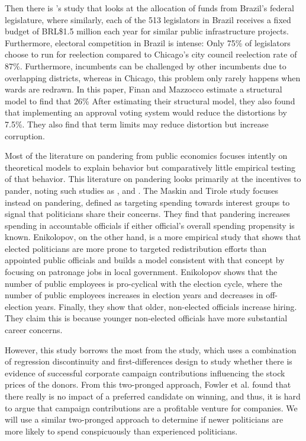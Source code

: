 Then there is \cite{finan2021electoral}'s study that looks at the allocation of funds from Brazil's federal legislature, where similarly, each of the 513 legislators in Brazil receives a fixed budget of BRL\$1.5 million each year for similar public infrastructure projects.  
Furthermore, electoral competition in Brazil is intense: Only 75\% of legislators choose to run for reelection compared to Chicago's city council reelection rate of 87\%.
Furthermore, incumbents can be challenged by other incumbents due to overlapping districts, whereas in Chicago, this problem only rarely happens when wards are redrawn.
In this paper, Finan and Mazzocco estimate a structural model to find that 26\% %
After estimating their structural model, they also found that implementing an approval voting system would reduce the distortions by 7.5\%. 
They also find that term limits may reduce distortion but increase corruption.

Most of the literature on pandering from public economics focuses intently on theoretical models to explain behavior but comparatively little empirical testing of that behavior. 
This literature on pandering looks primarily at the incentives to pander, noting such studies as \cite{MASKIN201979},  and \cite{ENIKOLOPOV201474}. 
The Maskin and Tirole study focuses instead on pandering, defined as targeting spending towards interest groups to signal that politicians share their concerns.
They find that pandering increases spending in accountable officials if either official's overall spending propensity is known. 
Enikolopov, on the other hand, is a more empirical study that shows that elected politicians are more prone to targeted redistribution efforts than appointed public officials and builds a model consistent with that concept by focusing on patronage jobs in local government. 
Enikolopov shows that the number of public employees is pro-cyclical with the election cycle, where the number of public employees increases in election years and decreases in off-election years. 
Finally, they show that older, non-elected officials increase hiring. 
They claim this is because younger non-elected officials have more substantial career concerns.

However, this study borrows the most from the \cite{fowleretalquidproquo} study, which uses a combination of regression discontinuity and first-differences design to study whether there is evidence of successful corporate campaign contributions influencing the stock prices of the donors. 
From this two-pronged approach, Fowler et al. found that there really is no impact of a preferred candidate on winning, and thus, it is hard to argue that campaign contributions are a profitable venture for companies. 
We will use a similar two-pronged approach to determine if newer politicians are more likely to spend conspicuously than experienced politicians. 

